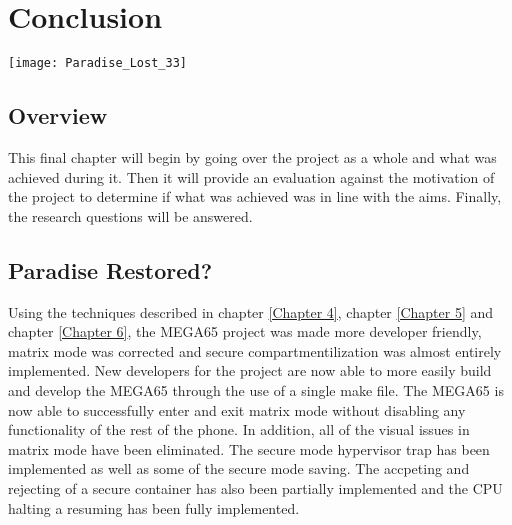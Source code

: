 
\chapter{Conclusion} %

\texttt{[image: Paradise\_Lost\_33]}

\label{Chapter 8} %

\section{Overview}

This final chapter will begin by going over the project as a whole and what was achieved during it. Then it will provide an evaluation against the motivation of the project to determine if what was achieved was in line with the aims. Finally, the research questions will be answered.


\section{Paradise Restored?}

\label{Ch8 Sec1}

Using the techniques described in chapter \ref{Chapter 4}, chapter \ref{Chapter 5} and chapter \ref{Chapter 6}, the MEGA65 project was made more developer friendly, matrix mode was corrected and secure compartmentilization was almost entirely implemented. New developers for the project are now able to more easily build and develop the MEGA65 through the use of a single make file. The MEGA65 is now able to successfully enter and exit matrix mode without disabling any functionality of the rest of the phone. In addition, all of the visual issues in matrix mode have been eliminated. The secure mode hypervisor trap has been implemented as well as some of the secure mode saving. The accpeting and rejecting of a secure container has also been partially implemented and the CPU halting a resuming has been fully implemented.\\

